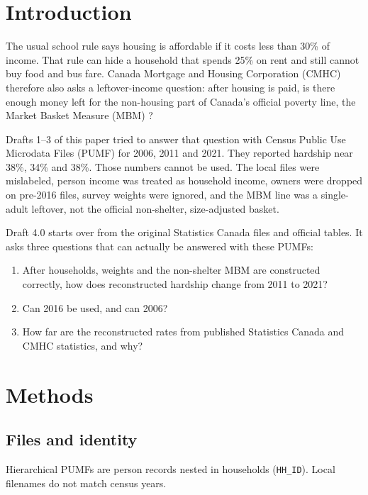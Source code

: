 \documentclass[11pt,letterpaper]{article}
\begin{document}
\section{Introduction}
\label{sec:intro}

The usual school rule says housing is affordable if it costs less than 30\% of income.
That rule can hide a household that spends 25\% on rent and still cannot buy food and bus fare.
Canada Mortgage and Housing Corporation (CMHC) therefore also asks a leftover-income question: after housing is paid, is there enough money left for the non-housing part of Canada's official poverty line, the Market Basket Measure (MBM) \cite{cmhc2020,statcan2021mbm}?

Drafts 1--3 of this paper tried to answer that question with Census Public Use Microdata Files (PUMF) for 2006, 2011 and 2021.
They reported hardship near 38\%, 34\% and 38\%.
Those numbers cannot be used.
The local files were mislabeled, person income was treated as household income, owners were dropped on pre-2016 files, survey weights were ignored, and the MBM line was a single-adult leftover, not the official non-shelter, size-adjusted basket.

Draft 4.0 starts over from the original Statistics Canada files and official tables.
It asks three questions that can actually be answered with these PUMFs:

\begin{enumerate}[leftmargin=1.6em]
  \item After households, weights and the non-shelter MBM are constructed correctly, how does reconstructed hardship change from 2011 to 2021?
  \item Can 2016 be used, and can 2006?
  \item How far are the reconstructed rates from published Statistics Canada and CMHC statistics, and why?
\end{enumerate}

\section{Methods}
\label{sec:methods}

\subsection{Files and identity}

Hierarchical PUMFs are person records nested in households (\texttt{HH\_ID}).
Local filenames do not match census years.
\end{document}
